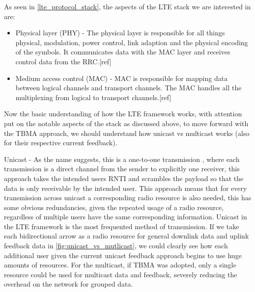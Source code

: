 \documentclass{article}
\begin{document}
As seen in \cref{lte_protocol_stack}, the aspects of the LTE stack we are interested in are:
\begin{itemize}
    \item Physical layer (PHY) - The physical layer is responsible for all things physical, modulation, power control, link adaption and the physical encoding of the symbols. It communicates data with the MAC layer and receives control data from the RRC.[ref]
    \item Medium access control (MAC) - MAC is responsible for mapping data between logical channels and transport channels. The MAC handles all the multiplexing from logical to transport channels.[ref] 
\end{itemize}

Now the basic understanding of how the LTE framework works, with attention put on the notable aspects of the stack as discussed above, to move forward with the TBMA approach, we should understand how unicast vs multicast works (also for their respective current feedback). 

Unicast - As the name suggests, this is a one-to-one transmission , where each transmission is a direct channel from the sender to explicitly one receiver, this approach takes the intended users RNTI and scrambles the payload so that the data is only receivable by the intended user. This approach means that for every transmission across unicast a corresponding radio resource is also needed, this has some obvious redundancies, given the repeated usage of a radio resource, regardless of multiple users have the same corresponding information. Unicast in the LTE framework is the most frequented method of transmission. If we take each bidirectional arrow as a radio resource for general downlink data and uplink feedback data in \cref{fig:unicast_vs_mutlicast}, we could clearly see how each additional user given the current unicast feedback approach begins to use huge amounts of resources. For the multicast, if TBMA was adopted, only a single resource could be used for multicast data and feedback, severely reducing the overhead on the network for grouped data. 
\end{document}
